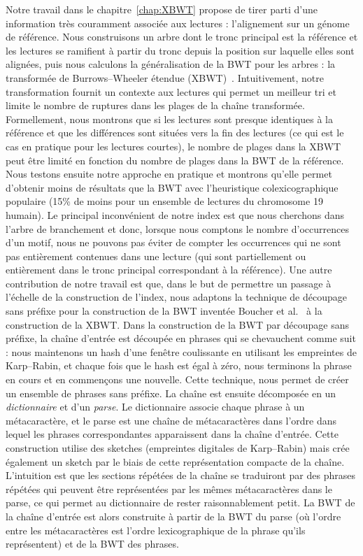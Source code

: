 Notre travail dans le chapitre~\ref{chap:XBWT} propose de tirer parti d'une information très couramment associée aux lectures : l'alignement sur un génome de référence. Nous construisons un arbre dont le tronc principal est la référence et les lectures se ramifient à partir du tronc depuis la position sur laquelle elles sont alignées, puis nous calculons la généralisation de la BWT pour les arbres : la transformée de Burrows--Wheeler étendue (XBWT)~\cite{ferragina2009compressing}. Intuitivement, notre transformation fournit un contexte aux lectures qui permet un meilleur tri et limite le nombre de ruptures dans les plages de la chaîne transformée. Formellement, nous montrons que si les lectures sont presque identiques à la référence et que les différences sont situées vers la fin des lectures (ce qui est le cas en pratique pour les lectures courtes), le nombre de plages dans la XBWT peut être limité en fonction du nombre de plages dans la BWT de la référence. Nous testons ensuite notre approche en pratique et montrons qu'elle permet d'obtenir moins de résultats que la BWT avec l'heuristique colexicographique populaire (15\% de moins pour un ensemble de lectures du chromosome 19 humain).
Le principal inconvénient de notre index est que nous cherchons dans l'arbre de branchement et donc, lorsque nous comptons le nombre d'occurrences d'un motif, nous ne pouvons pas éviter de compter les occurrences qui ne sont pas entièrement contenues dans une lecture (qui sont partiellement ou entièrement dans le tronc principal correspondant à la référence).
%
Une autre contribution de notre travail est que, dans le but de permettre un passage à l'échelle de la construction de l'index, nous adaptons la technique de découpage sans préfixe pour la construction de la BWT inventée Boucher et al.~\cite{boucher2019prefix} à la construction de la XBWT. 
%
Dans la construction de la BWT par découpage sans préfixe, la chaîne d'entrée est découpée en phrases qui se chevauchent comme suit : nous maintenons un hash d'une fenêtre coulissante en utilisant les empreintes de Karp--Rabin, et chaque fois que le hash est égal à zéro, nous terminons la phrase en cours et en commençons une nouvelle. Cette technique, nous permet de créer un ensemble de phrases sans préfixe.
La chaîne est ensuite décomposée en un \emph{dictionnaire} et d'un \emph{parse}. 
Le dictionnaire associe chaque phrase à un métacaractère, et le parse est une chaîne de métacaractères dans l'ordre dans lequel les phrases correspondantes apparaissent dans la chaîne d'entrée.
Cette construction utilise des sketches (empreintes digitales de Karp--Rabin) mais crée également un sketch par le biais de cette représentation compacte de la chaîne.
L'intuition est que les sections répétées de la chaîne se traduiront par des phrases répétées qui peuvent être représentées par les mêmes métacaractères dans le parse, ce qui permet au dictionnaire de rester raisonnablement petit.
La BWT de la chaîne d'entrée est alors construite à partir de la BWT du parse (où l'ordre entre les métacaractères est l'ordre lexicographique de la phrase qu'ils représentent) et de la BWT des phrases.
